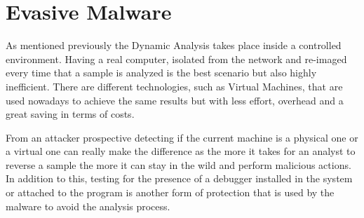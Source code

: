 

 
\section{Evasive Malware}
\label{sec:evmal}

As mentioned previously the Dynamic Analysis takes place inside a controlled environment. Having a real computer, isolated from the network and re-imaged every time that a sample is analyzed is the best scenario but also highly inefficient. There are different technologies, such as Virtual Machines, that are used nowadays to achieve the same results but with less effort, overhead and a great saving in terms of costs. 

From an attacker prospective detecting if the current machine is a physical one or a virtual one can really make the difference as the more it takes for an analyst to reverse a sample the more it can stay in the wild and perform malicious actions. In addition to this, testing for the presence of a debugger installed in the system or attached to the program is another form of protection that is used by the malware to avoid the analysis process.

